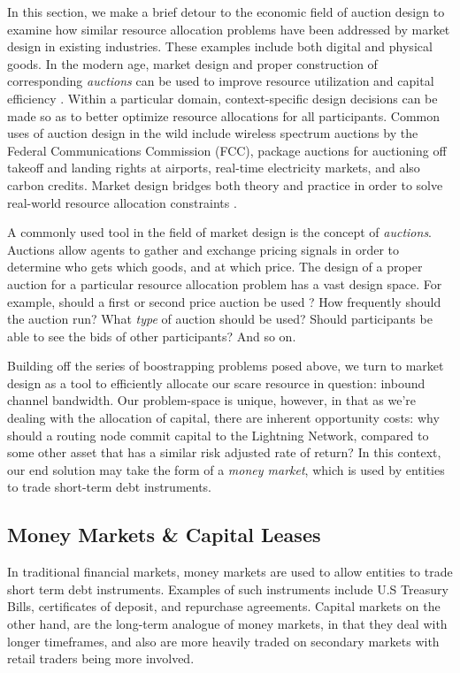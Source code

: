 \documentclass[10pt,a4paper]{article}
\theoremstyle{definition}
\begin{document}
In this section, we make a brief detour to the economic field of auction design
to examine how similar resource allocation problems have been addressed by
market design in existing industries. These examples include both digital and
physical goods. In the modern age, market design and proper construction of
corresponding \emph{auctions} can be used to improve resource utilization and
capital efficiency \cite{cramton2010}.  Within a particular domain,
context-specific design decisions can be made so as to better optimize resource
allocations for all participants. Common uses of auction design in the wild
include wireless spectrum auctions by the Federal Communications Commission
(FCC), package auctions for auctioning off takeoff and landing rights at
airports, real-time electricity markets, and also carbon credits. Market design
bridges both theory and practice in order to solve real-world resource
allocation constraints \cite{cramton2008}.

A commonly used tool in the field of market design is the concept of
\emph{auctions}.  Auctions allow agents to gather and exchange pricing signals
in order to determine who gets which goods, and at which price. The design of a
proper auction for a particular resource allocation problem has a vast design
space. For example, should a first or second price auction be used
\cite{auctionCS}? How frequently should the auction run? What \emph{type} of
auction should be used? Should participants be able to see the bids of other
participants? And so on.

Building off the series of boostrapping problems posed above, we turn to market
design as a tool to efficiently allocate our scare resource in question:
inbound channel bandwidth. Our problem-space is unique, however, in that as
we're dealing with the allocation of capital, there are inherent opportunity
costs: why should a routing node commit capital to the Lightning Network,
compared to some other asset that has a similar risk adjusted rate of return?
In this context, our end solution may take the form of a \emph{money market},
which is used by entities to trade short-term debt instruments.


\subsection{Money Markets \& Capital Leases} %

In traditional financial markets, money markets are used to allow entities to
trade short term debt instruments. Examples of such instruments include U.S
Treasury Bills, certificates of deposit, and repurchase agreements. Capital
markets on the other hand, are the long-term analogue of money markets, in that
they deal with longer timeframes, and also are more heavily traded on secondary
markets with retail traders being more involved.
\end{document}
